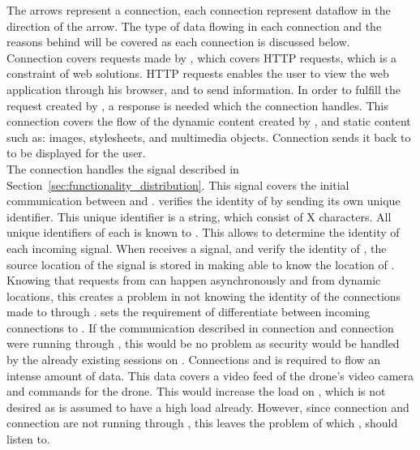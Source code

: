 The arrows represent a connection, each connection represent dataflow in the direction of the arrow.
The type of data flowing in each connection and the reasons behind will be covered as each connection is discussed below. \\

Connection  covers requests made by , which covers HTTP requests, which is a constraint of web solutions.
HTTP requests enables the user to view the web application through his browser, and to send information.
In order to fulfill the request created by , a response is needed which the connection  handles.
This connection covers the flow of the dynamic content created by , and static content such as: images, stylesheets, and multimedia objects.
Connection  sends it back to  to be displayed for the user. \\

The connection  handles the signal described in Section~\ref{sec:functionality_distribution}.
This signal covers the initial communication between  and .  verifies the identity of  by  sending its own unique identifier.
This unique identifier is a string, which consist of X characters. All unique identifiers of each  is known to .
This allows  to determine the identity of each incoming signal. When  receives a signal, and verify the identity of , the source location of the signal is stored in  making  able to know the location of . \\

Knowing that requests from  can happen asynchronously and from dynamic locations, this creates a problem in not knowing the identity of the connections made to  through .
 sets the requirement of differentiate between incoming connections to .
If the communication described in connection  and connection  were running through , this would be no problem as security would be handled by the already existing sessions on .
Connections  and  is required to flow an intense amount of data.
This data covers a video feed of the drone's video camera and commands for the drone.
This would increase the load on , which is not desired as  is assumed to have a high load already.
However, since connection  and connection  are not running through , this leaves the problem of which ,  should listen to. \\

